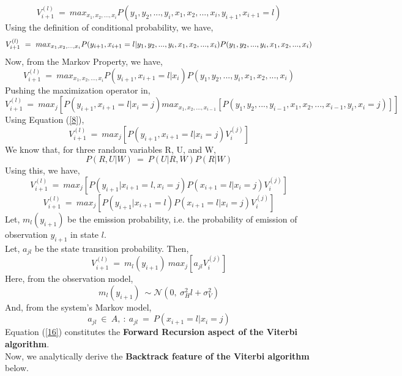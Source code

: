 \documentclass[12pt, draftcls, onecolumn]{IEEEtran}
\begin{document}
\begin{equation}\label{9}
    V_{i+1}^{(l)}\ =\ max_{x_1,x_2,...,x_i}P(y_1,y_2,...,y_i,x_1,x_2,...,x_i,y_{i+1},x_{i+1}=l)
\end{equation}
Using the definition of conditional probability, we have,
\begin{equation}\label{10}
    V_{i+1}^{(l)}\ =\ max_{x_1,x_2,...,x_i}P(y_{i+1},x_{i+1}=l|y_1,y_2,...,y_i,x_1,x_2,...,x_i)\\P(y_1,y_2,...,y_i,x_1,x_2,...,x_i)
\end{equation}
Now, from the Markov Property, we have,
\begin{equation}\label{11}
    V_{i+1}^{(l)}\ =\ max_{x_1,x_2,...,x_i}P(y_{i+1},x_{i+1}=l|x_i)P(y_1,y_2,...,y_i,x_1,x_2,...,x_i)
\end{equation}
Pushing the maximization operator in,
\begin{equation}\label{12}
    V_{i+1}^{(l)}\ =\ max_{j}[P(y_{i+1},x_{i+1}=l|x_i=j)max_{x_1,x_2,...,x_{i-1}}[P(y_1,y_2,...,y_{i-1},x_1,x_2,...,x_{i-1},y_i,x_i=j)]]
\end{equation}
Using Equation (\ref{8}),
\begin{equation}\label{13}
    V_{i+1}^{(l)}\ =\ max_{j}[P(y_{i+1},x_{i+1}=l|x_i=j)V_i^{(j)}]
\end{equation}
We know that, for three random variables R, U, and W,
\[P(R,U|W)\ =\ P(U|R,W)P(R|W)\]
Using this, we have,
\begin{equation}\label{14}
    V_{i+1}^{(l)}\ =\ max_{j}[P(y_{i+1}|x_{i+1}=l,x_i=j)P(x_{i+1}=l|x_i=j)V_i^{(j)}]
\end{equation}
\begin{equation}\label{15}
    V_{i+1}^{(l)}\ =\ max_{j}[P(y_{i+1}|x_{i+1}=l)P(x_{i+1}=l|x_i=j)V_i^{(j)}]
\end{equation}
Let, $m_l(y_{i+1})$ be the emission probability, i.e. the probability of emission of observation $y_{i+1}$ in state $l$.
\\Let, $a_{jl}$ be the state transition probability.
Then, 
\begin{equation}\label{16}
    V_{i+1}^{(l)}\ =\ m_l(y_{i+1})\ max_{j}[a_{jl}V_i^{(j)}]
\end{equation}
Here, from the observation model,
\[m_l(y_{i+1})\ \sim \mathcal{N}(0,\ \sigma_H^2l+\sigma_V^2)\]
And, from the system's Markov model,
\[a_{jl}\ \in\ A,\ :\ a_{jl}\ =\ P(x_{i+1}=l|x_i=j)\]
Equation (\ref{16}) constitutes the \textbf{Forward Recursion aspect of the Viterbi algorithm}.
\\Now, we analytically derive the \textbf{Backtrack feature of the Viterbi algorithm} below.
\end{document}
